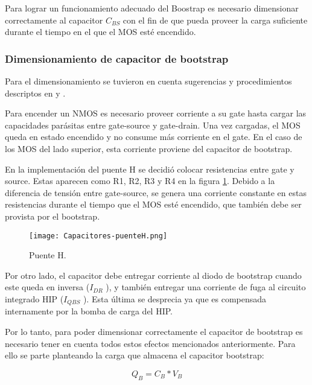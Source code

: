 \noindent Para lograr un funcionamiento adecuado del Boostrap es necesario dimensionar correctamente al capacitor $C_{BS}$ con el fin de que pueda proveer la carga suficiente durante el tiempo en el que el MOS esté encendido.


\subsubsection{Dimensionamiento de capacitor de bootstrap}

\noindent Para el dimensionamiento se tuvieron en cuenta sugerencias y procedimientos descriptos en \cite{HIP4081A_AN9405} y \cite{HIP4081A_FN3659}.

\noindent Para encender un NMOS es necesario proveer corriente a su gate hasta cargar las capacidades parásitas entre gate-source y gate-drain. Una vez cargadas, el MOS queda en estado encendido y no consume más corriente en el gate. En el caso de los MOS del lado superior, esta corriente proviene del capacitor de bootstrap. 

\noindent En la implementación del puente H se decidió colocar resistencias entre gate y source. Estas aparecen como R1, R2, R3 y R4 en la figura \ref{fig:img_capacitores-puenteH}. Debido a la diferencia de tensión entre gate-source, se genera una corriente constante en estas resistencias durante el tiempo que el MOS esté encendido, que también debe ser provista por el  bootstrap.

\begin{figure}[H]
	\centering
	\texttt{[image: Capacitores-puenteH.png]}
	\caption{Puente H.}
	\label{fig:img_capacitores-puenteH}
\end{figure}

\noindent Por otro lado, el capacitor debe entregar corriente al diodo de bootstrap cuando este queda en inversa ($I_{DR}$ ), y también entregar una corriente de fuga al circuito integrado HIP ($I_{QBS}$ ). Esta última se desprecia ya que es compensada internamente por la bomba de carga del HIP.

\noindent Por lo tanto, para poder dimensionar correctamente el capacitor de bootstrap es necesario tener en cuenta todos estos efectos mencionados anteriormente. Para ello se parte planteando la carga que almacena el capacitor bootstrap:

\begin{equation} \label{eq_carga-cap-bootstrap}
Q_B=C_B*V_B
\end{equation}

